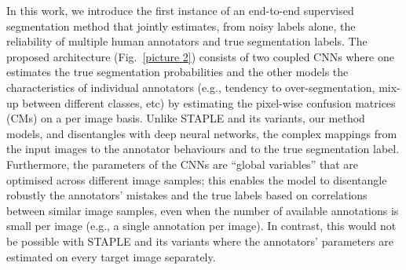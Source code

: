 


In this work, we introduce the first instance of an end-to-end supervised segmentation method that jointly estimates, from noisy labels alone, the reliability of multiple human annotators and true segmentation labels. The proposed architecture (Fig.~\ref{picture 2}) consists of two coupled CNNs where one estimates the true segmentation probabilities and the other models the characteristics of individual annotators (e.g., tendency to over-segmentation, mix-up between different classes, etc) by estimating the pixel-wise confusion matrices (CMs) on a per image basis. Unlike STAPLE \cite{warfield2004simultaneous} and its variants, our method models, and disentangles with deep neural networks, the complex mappings from the input images to the annotator behaviours and to the true segmentation label. Furthermore, the parameters of the CNNs are ``global variables'' that are optimised across different image samples; this enables the model to disentangle robustly the annotators' mistakes and the true labels based on correlations between similar image samples, even when the number of available annotations is small per image (e.g., a single annotation per image). In contrast, this would not be possible with STAPLE \cite{warfield2004simultaneous} and its variants \cite{asman2012formulating,cardoso2013steps} where the annotators' parameters are estimated on every target image separately.

